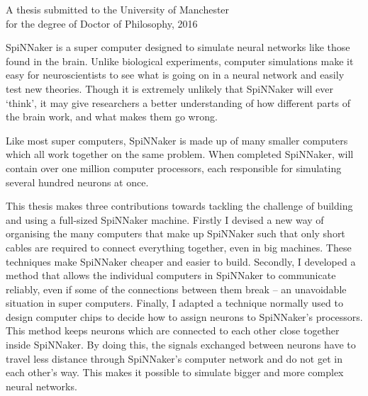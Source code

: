 {
	
	
	
	\vfill
	
	\begin{center}
		\textsc{\large\thesistitle}
		
		\vspace{0.5em}
		
		\thesisauthor
		
		\vspace{0.5em}
		
		A thesis submitted to the University of Manchester\\
		for the degree of Doctor of Philosophy, 2016
	\end{center}
	
	\vfill
	
	
	SpiNNaker is a super computer designed to simulate neural networks like those
	found in the brain. Unlike biological experiments, computer simulations make
	it easy for neuroscientists to see what is going on in a neural network and
	easily test new theories. Though it is extremely unlikely that SpiNNaker will
	ever `think', it may give researchers a better understanding of how different
	parts of the brain work, and what makes them go wrong.
	
	Like most super computers, SpiNNaker is made up of many smaller computers
	which all work together on the same problem. When completed SpiNNaker, will
	contain over one million computer processors, each responsible for simulating
	several hundred neurons at once.
	
	This thesis makes three contributions towards tackling the challenge of
	building and using a full-sized SpiNNaker machine. Firstly I devised a new
	way of organising the many computers that make up SpiNNaker such that only
	short cables are required to connect everything together, even in big
	machines.  These techniques make SpiNNaker cheaper and easier to build.
	Secondly, I developed a method that allows the individual computers in
	SpiNNaker to communicate reliably, even if some of the connections between
	them break -- an unavoidable situation in super computers. Finally, I adapted
	a technique normally used to design computer chips to decide how to assign
	neurons to SpiNNaker's processors. This method keeps neurons which are
	connected to each other close together inside SpiNNaker. By doing this, the
	signals exchanged between neurons have to travel less distance through
	SpiNNaker's computer network and do not get in each other's way. This makes
	it possible to simulate bigger and more complex neural networks.
	
	\par%
}
